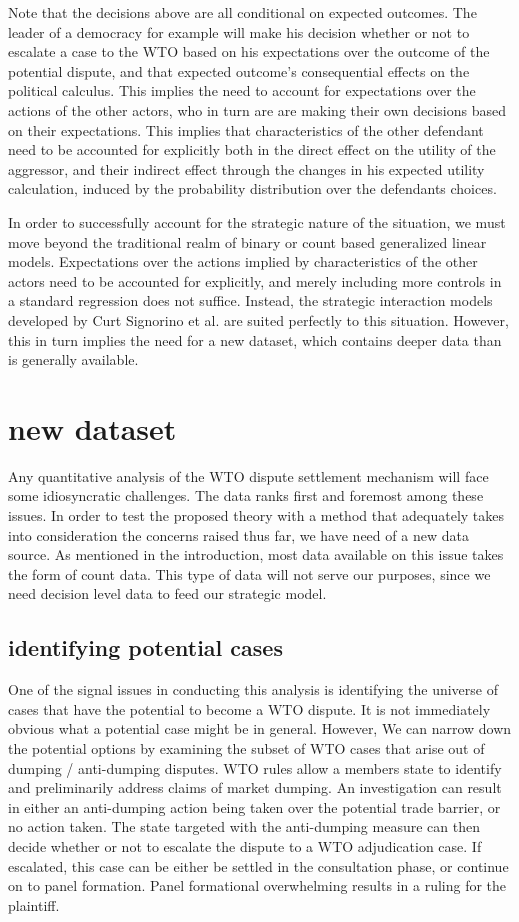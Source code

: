 \documentclass[]{article}
\begin{document}
 Note that the decisions above are all conditional on expected outcomes. The leader of a democracy for example will make his decision whether or not to escalate a case to the WTO based on his expectations over the outcome of the potential dispute, and that expected outcome's consequential effects on the political calculus. This implies the need to account for expectations over the actions of the other actors, who in turn are are making their own decisions based on their expectations. This implies that characteristics of the other defendant need to be accounted for explicitly both in the direct effect on the utility of the aggressor, and their indirect effect through the changes in his expected utility calculation, induced by the probability distribution over the defendants choices. 

In order to successfully account for the strategic nature of the situation, we must move beyond the traditional realm of binary or count based generalized linear models. Expectations over the actions implied by characteristics of the other actors need to be accounted for explicitly, and merely including more controls in a standard regression does not suffice. Instead, the strategic interaction models developed by Curt Signorino et al. are suited perfectly to this situation. However, this in turn implies the need for a new dataset, which contains deeper  data than is generally available. 

\section{new dataset}
Any quantitative analysis of the WTO dispute settlement mechanism will face some idiosyncratic challenges. The data ranks first and foremost among these issues.  In order to test the proposed theory with a method that adequately takes into consideration the concerns raised thus far,  we have need of a new data source. As mentioned in the introduction, most data available on this issue takes the form of count data. This type of data will not serve our purposes, since we need decision level data to feed our strategic model.   

\subsection{identifying potential cases}
One  of the signal issues in conducting this analysis is identifying the universe of cases that have the potential to become a WTO dispute. It is not immediately obvious what a potential case might be in general. However, We can narrow down the potential options by examining the subset of WTO cases that arise out of dumping / anti-dumping disputes. WTO rules allow a members state to identify and preliminarily address claims of market dumping. An investigation can result in either an anti-dumping action being taken over the potential trade barrier, or no action taken. The state targeted with the anti-dumping measure can then decide whether or not to escalate the dispute to a WTO adjudication case. If escalated, this case can be either be settled in the consultation phase, or continue on to panel formation. Panel formational overwhelming results in a ruling for the plaintiff. \\
\end{document}
